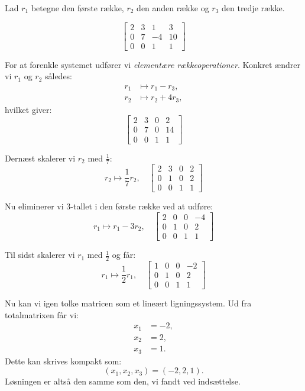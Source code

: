 \begin{example}
    \label{ex:augmented-matrix}
Lad $r_1$ betegne den første række, $r_2$ den anden række og $r_3$ den tredje række.

\[
\left[\begin{array}{cccc}
2 & 3 & 1 & 3 \\
0 & 7 & -4 & 10 \\
0 & 0 & 1 & 1
\end{array}\right]
\]

For at forenkle systemet udfører vi \textit{elementære rækkeoperationer}. Konkret ændrer vi $r_1$ og $r_2$ således:
\[
\begin{aligned}
r_1 & \mapsto r_1 - r_3, \\
r_2 & \mapsto r_2 + 4r_3,
\end{aligned}
\]
hvilket giver:
\[
\left[\begin{array}{cccc}
2 & 3 & 0 & 2 \\
0 & 7 & 0 & 14 \\
0 & 0 & 1 & 1
\end{array}\right]
\]

Dernæst skalerer vi $r_2$ med $\frac{1}{7}$:
\[
r_2 \mapsto \frac{1}{7}r_2, \quad \left[\begin{array}{cccc}
2 & 3 & 0 & 2 \\
0 & 1 & 0 & 2 \\
0 & 0 & 1 & 1
\end{array}\right]
\]

Nu eliminerer vi $3$-tallet i den første række ved at udføre:
\[
r_1 \mapsto r_1 - 3r_2, \quad \left[\begin{array}{cccc}
2 & 0 & 0 & -4 \\
0 & 1 & 0 & 2 \\
0 & 0 & 1 & 1
\end{array}\right]
\]

Til sidst skalerer vi $r_1$ med $\frac{1}{2}$ og får:
\[
r_1 \mapsto \frac{1}{2}r_1, \quad \left[\begin{array}{cccc}
1 & 0 & 0 & -2 \\
0 & 1 & 0 & 2 \\
0 & 0 & 1 & 1
\end{array}\right]
\]

Nu kan vi igen tolke matricen som et lineært ligningssystem. Ud fra totalmatrixen får vi:
\[
\begin{aligned}
x_1 &= -2, \\
x_2 &= 2, \\
x_3 &= 1.
\end{aligned}
\]
Dette kan skrives kompakt som:
\[
(x_1, x_2, x_3) = (-2, 2, 1).
\]
Løsningen er altså den samme som den, vi fandt ved indsættelse.
\end{example}

